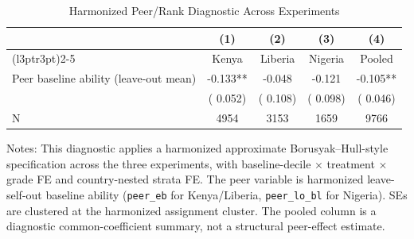 \begin{table}[!htbp]
\centering
\caption{Harmonized Peer/Rank Diagnostic Across Experiments}
\label{tab:pooled_peer_effects}
\begin{threeparttable}
\begin{tabular}[t]{lcccc}
\toprule
 & (1) & (2) & (3) & (4) \\
\cmidrule(l{3pt}r{3pt}){2-5}
 & Kenya & Liberia & Nigeria & Pooled \\
\midrule
Peer baseline ability (leave-out mean) &  -0.133** &  -0.048 &  -0.121 &  -0.105** \\
 & (  0.052) & (  0.108) & (  0.098) & (  0.046) \\
\addlinespace
N & 4954 & 3153 & 1659 & 9766 \\
\bottomrule
\end{tabular}
\begin{tablenotes}[para]
\item Notes: This diagnostic applies a harmonized approximate Borusyak--Hull-style specification across the three experiments, with baseline-decile $\times$ treatment $\times$ grade FE and country-nested strata FE. The peer variable is harmonized leave-self-out baseline ability (\texttt{peer\_eb} for Kenya/Liberia, \texttt{peer\_lo\_bl} for Nigeria). SEs are clustered at the harmonized assignment cluster. The pooled column is a diagnostic common-coefficient summary, not a structural peer-effect estimate.
\end{tablenotes}
\end{threeparttable}
\end{table}
